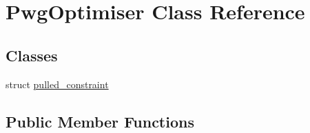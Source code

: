 \hypertarget{classPwgOptimiser}{}\section{Pwg\+Optimiser Class Reference}
\label{classPwgOptimiser}
\subsection*{Classes}
\begin{DoxyCompactItemize}
\item 
struct \hyperlink{structPwgOptimiser_1_1pulled__constraint}{pulled\+\_\+constraint}
\end{DoxyCompactItemize}
\subsection*{Public Member Functions}
